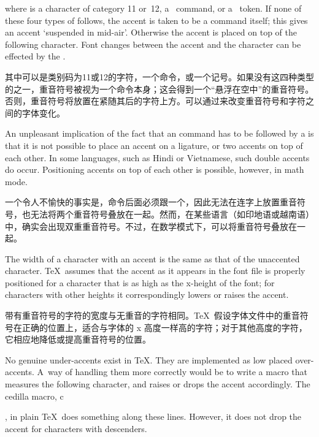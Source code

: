 \begin{disp}%
     \end{disp}
where  is a character of category 11 or~12,
 a~ command,
or a~ token. If none of these
four types of  follows, the accent is taken to be a
 command itself; this gives an accent `suspended
in mid-air'. Otherwise the accent is placed
on top of the following character.
Font changes between the accent and the character can be effected
by the .

其中可以是类别码为11或12的字符，一个命令，或一个记号。如果没有这四种类型的之一，重音符号被视为一个命令本身；这会得到一个“悬浮在空中”的重音符号。否则，重音符号将放置在紧随其后的字符上方。可以通过来改变重音符号和字符之间的字体变化。

An unpleasant implication of the fact that an  command
has to be followed by a  is that it is not
possible to place an accent on a ligature, or
two accents on top of each other.
In some languages, such as Hindi or Vietnamese,
such double accents do occur.
Positioning accents on top of each other is possible,
however, in math mode.

一个令人不愉快的事实是，命令后面必须跟一个，因此无法在连字上放置重音符号，也无法将两个重音符号叠放在一起。然而，在某些语言（如印地语或越南语）中，确实会出现双重重音符号。不过，在数学模式下，可以将重音符号叠放在一起。

The width of a character with an accent is the same as that of
the unaccented character. \TeX\ assumes that the 
accent as it appears in the font file
is properly positioned for a character that is as high
as the x-height of the font; for characters with other heights
it correspondingly lowers or raises the accent.

带有重音符号的字符的宽度与无重音的字符相同。\TeX\ 假设字体文件中的重音符号在正确的位置上，适合与字体的 x 高度一样高的字符；对于其他高度的字符，它相应地降低或提高重音符号的位置。

No genuine under-accents exist in \TeX. They are
implemented as low placed over-accents. A~way of handling
them more correctly would be to write a macro that
measures the following character, and raises or drops
the accent accordingly.
The cedilla macro, \cstoidx c\par,
in plain \TeX\ does something along these lines. However,
it does not drop the accent for characters with descenders.

